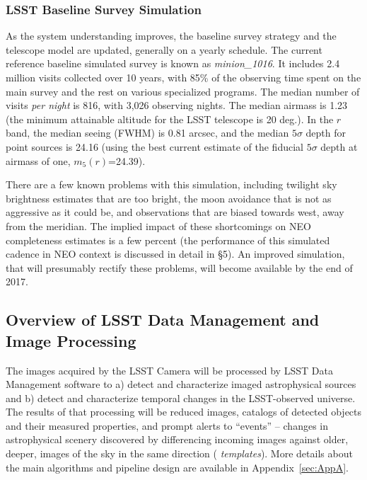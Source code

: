 \subsubsection{LSST Baseline Survey Simulation}

As the system understanding improves, the baseline survey strategy and the telescope model
are updated, generally on a yearly schedule. The current
reference baseline simulated survey is known as {\it minion\_1016}. It includes 2.4
million visits collected over 10 years, with 85\% of the observing time spent on the
main survey and the rest on various specialized programs. The median number of visits
{\it per night} is 816, with 3,026 observing nights. The median airmass is 1.23 (the
minimum attainable altitude for the LSST telescope is 20 deg.). In the $r$ band, the median
seeing (FWHM) is 0.81 arcsec, and the median $5\sigma$ depth for point sources is 24.16
(using the best current estimate of the fiducial $5\sigma$ depth at airmass of one, $m_5(r)$=24.39).

There are a few known problems with this simulation, including twilight sky brightness
estimates that are too bright, the moon avoidance that is not as aggressive as it could be,
and observations that are biased towards west, away from the meridian. The implied impact
of these shortcomings on NEO completeness estimates is a few percent (the performance
of this simulated cadence in NEO context is discussed in detail in \S5). An improved simulation,
that will presumably rectify these problems, will become available by the end of 2017.


\subsection{Overview of LSST  Data Management and Image Processing}

The images acquired by the LSST Camera will be processed by LSST Data Management
software \citep{juric15} to a) detect and characterize imaged
astrophysical sources and b) detect and characterize temporal changes
in the LSST-observed universe. The results of that processing will be
reduced images, catalogs of detected objects and their measured properties, and
prompt alerts to ``events'' -- changes in astrophysical scenery discovered by differencing
incoming images against older, deeper, images of the sky in the same direction ({\em
templates}). More details about the main algorithms and pipeline design are available
in Appendix~\ref{sec:AppA}.

